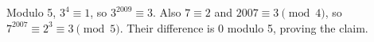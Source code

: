Modulo 5, $3^4\equiv 1$, so $3^{2009}\equiv 3$. Also $7\equiv 2$ and $2007\equiv 3\pmod 4$, so $7^{2007}\equiv 2^3\equiv 3\pmod 5$. Their difference is 0 modulo 5, proving the claim.
